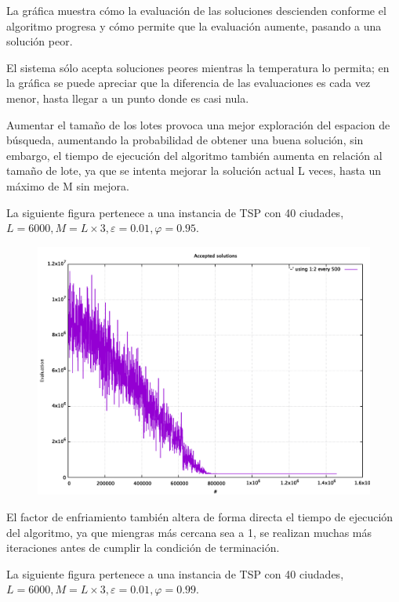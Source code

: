 \documentclass[12pt, letterpaper]{article}
\begin{document}
La gráfica muestra cómo la evaluación de las soluciones descienden conforme el algoritmo progresa y cómo permite que la evaluación aumente, pasando a una solución peor.
\par
El sistema sólo acepta soluciones peores mientras la temperatura lo permita; en la gráfica se puede apreciar que la diferencia de las evaluaciones es cada vez menor, hasta llegar a un punto donde es casi nula.
\par
\bigskip
Aumentar el tamaño de los lotes provoca una mejor exploración del espacion de búsqueda, aumentando la probabilidad de obtener una buena solución, sin embargo, el tiempo de ejecución del algoritmo también aumenta en relación al tamaño de lote, ya que se intenta mejorar la solución actual L veces, hasta un máximo de M sin mejora.
\par
La siguiente figura pertenece a una instancia de TSP con 40 ciudades, $L = 6000, M = L\times3, \varepsilon = 0.01, \varphi = 0.95$.

\begin{figure}[H]
    \centering
    \includegraphics[width=\linewidth]{2.png}
    \label{fig:2}
\end{figure}

El factor de enfriamiento también altera de forma directa el tiempo de ejecución del algoritmo, ya que miengras más cercana sea a 1, se realizan muchas más iteraciones antes de cumplir la condición de terminación.
\par
La siguiente figura pertenece a una instancia de TSP con 40 ciudades, $L = 6000, M = L\times3, \varepsilon = 0.01, \varphi = 0.99$.
\end{document}
